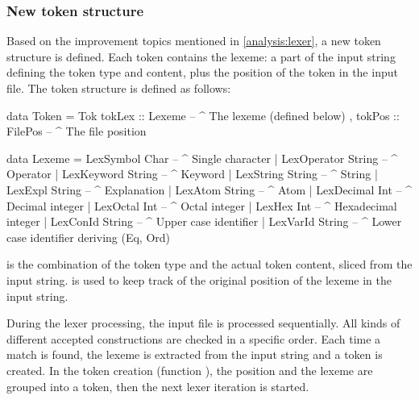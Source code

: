 \subsubsection{New token structure}
Based on the improvement topics mentioned in \autoref{analysis:lexer}, a new token structure is defined.
Each token contains the lexeme: a part of the input string defining the token type and content, plus the position of the token in the input file.
The token structure is defined as follows:

\begin{haskell}
data Token = Tok { tokLex :: Lexeme    -- ^ The lexeme (defined below)
                 , tokPos :: FilePos   -- ^ The file position
                 }

data Lexeme  = LexSymbol      Char     -- ^ Single character
             | LexOperator    String   -- ^ Operator
             | LexKeyword     String   -- ^ Keyword
             | LexString      String   -- ^ String
             | LexExpl        String   -- ^ Explanation
             | LexAtom        String   -- ^ Atom
             | LexDecimal     Int      -- ^ Decimal integer
             | LexOctal       Int      -- ^ Octal integer
             | LexHex         Int      -- ^ Hexadecimal integer
             | LexConId       String   -- ^ Upper case identifier
             | LexVarId       String   -- ^ Lower case identifier
  deriving (Eq, Ord)
\end{haskell}
%
 is the combination of the token type and the actual token content, sliced from the input string.
 is used to keep track of the original position of the lexeme in the input string.

During the lexer processing, the input file is processed sequentially.
All kinds of different accepted constructions are checked in a specific order.
Each time a match is found, the lexeme is extracted from the input string and a token is created.
In the token creation (function ), the position and the lexeme are grouped into a token, then the next lexer iteration is started.
